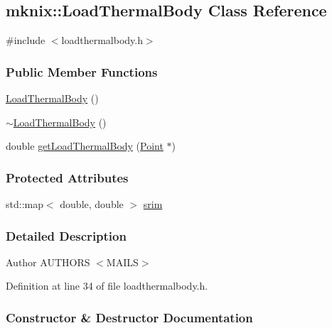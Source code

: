 \hypertarget{classmknix_1_1_load_thermal_body}{}\subsection{mknix\+:\+:Load\+Thermal\+Body Class Reference}
\label{classmknix_1_1_load_thermal_body}


{\ttfamily \#include $<$loadthermalbody.\+h$>$}

\subsubsection*{Public Member Functions}
\begin{DoxyCompactItemize}
\item 
\hyperlink{classmknix_1_1_load_thermal_body_a6bb009561ef8a680fe8483a8bc4c271d}{Load\+Thermal\+Body} ()
\item 
\hyperlink{classmknix_1_1_load_thermal_body_a1dbbd71a5438bfff970ebadbebd65ae1}{$\sim$\+Load\+Thermal\+Body} ()
\item 
double \hyperlink{classmknix_1_1_load_thermal_body_a174097626bef1d662a7ee0c24cb62ac1}{get\+Load\+Thermal\+Body} (\hyperlink{classmknix_1_1_point}{Point} $\ast$)
\end{DoxyCompactItemize}
\subsubsection*{Protected Attributes}
\begin{DoxyCompactItemize}
\item 
std\+::map$<$ double, double $>$ \hyperlink{classmknix_1_1_load_thermal_body_adb98192e4cdce5830b451f8272a6e20f}{srim}
\end{DoxyCompactItemize}


\subsubsection{Detailed Description}
\begin{DoxyAuthor}{Author}
A\+U\+T\+H\+O\+R\+S $<$\+M\+A\+I\+L\+S$>$ 
\end{DoxyAuthor}


Definition at line 34 of file loadthermalbody.\+h.



\subsubsection{Constructor \& Destructor Documentation}
\hypertarget{classmknix_1_1_load_thermal_body_a6bb009561ef8a680fe8483a8bc4c271d}{}
